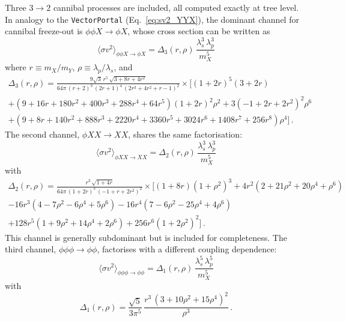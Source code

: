 \documentclass[11pt]{article}
\numberwithin{equation}{section}
\newcommand{\sigmavv}{\langle\sigma v^2\rangle}
\newcommand{\mX}{m_X}
\newcommand{\mY}{m_Y}
\begin{document}
Three $3\to2$ cannibal processes are included, all computed exactly at tree level. In analogy to the \texttt{VectorPortal} (Eq.~\eqref{eq:sv2_YYX}), the dominant channel for cannibal freeze-out is $\phi\phi X\to\phi X$, whose cross section can be written as
\begin{equation}
    \sigmavv_{\phi\phi X\to\phi X} = \Delta_3(r,\rho)\,\frac{\lambda_s^3\,\lambda_p^3}{\mX^5}
    \label{eq:HP_sv2_YYX}
\end{equation}
where $r \equiv \mX/\mY$, $\rho \equiv \lambda_p/\lambda_s$, and
\begin{multline}
    \Delta_3(r,\rho) = \frac{9\sqrt{3}\,r^5\,\sqrt{3+8r+4r^2}}{64\pi\,(r+2)^3\,(2r+1)^4\,(2r^3+4r^2+r-1)^2}
    \times \Big[
    (1+2r)^5(3+2r) \\
    + (9 + 16r + 180r^2 + 400r^3 + 288r^4 + 64r^5)(1+2r)^2\rho^2
    + 3(-1+2r+2r^2)^2\rho^6 \\
    + (9 + 8r + 140r^2 + 888r^3 + 2220r^4
    + 3360r^5 + 3024r^6 + 1408r^7 + 256r^8)\rho^4
    \Big]\,.
    \label{eq:HP_Delta3}
\end{multline}
The second channel, $\phi XX\to XX$, shares the same factorisation:
\begin{equation}
    \sigmavv_{\phi XX\to XX} = \Delta_2(r,\rho)\,\frac{\lambda_s^3\,\lambda_p^3}{\mX^5}
    \label{eq:HP_sv2_YXX}
\end{equation}
with
\begin{multline}
    \Delta_2(r,\rho) = \frac{r^3\,\sqrt{1+4r}}{64\pi\,(1+2r)^3\,(-1+r+2r^2)^2}
    \times \Big[
    (1+8r)(1+\rho^2)^3
    + 4r^2(2 + 21\rho^2 + 20\rho^4 + \rho^6) \\
    - 16r^3(4 - 7\rho^2 - 6\rho^4 + 5\rho^6)
    - 16r^4(7 - 6\rho^2 - 25\rho^4 + 4\rho^6) \\
    + 128r^5(1 + 9\rho^2 + 14\rho^4 + 2\rho^6)
    + 256r^6(1 + 2\rho^2)^2
    \Big]\,.
    \label{eq:HP_Delta2}
\end{multline}
This channel is generally subdominant but is included for completeness. The third channel, $\phi\phi\phi\to\phi\phi$, factorises with a different coupling dependence:
\begin{equation}
    \sigmavv_{\phi\phi\phi\to\phi\phi} = \Delta_1(r,\rho)\,\frac{\lambda_s^5\,\lambda_p^5}{\mX^5}
    \label{eq:HP_sv2_YYY}
\end{equation}
with
\begin{equation}
    \Delta_1(r,\rho) = \frac{\sqrt{5}}{3\pi^5}\,\frac{r^3\,(3 + 10\rho^2 + 15\rho^4)^2}{\rho^3}\,.
    \label{eq:HP_Delta1}
\end{equation}
\end{document}
